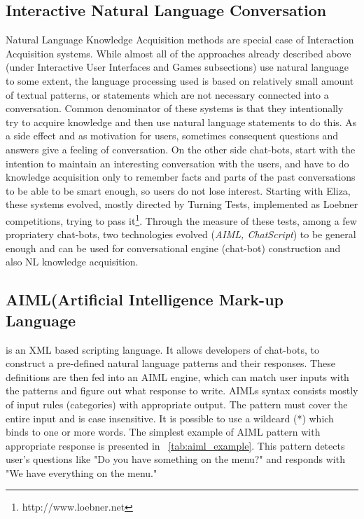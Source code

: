 \subsection{Interactive Natural Language Conversation}
Natural Language Knowledge Acquisition methods are special case of Interaction Acquisition
systems. While almost all of the approaches already described above (under 
Interactive User Interfaces and Games subsections) use natural language to some
extent, the language processing used is based on relatively small amount of
 textual patterns, or statements which are not necessary connected into a conversation. Common denominator of these systems is that they intentionally 
try to acquire knowledge and then use natural language statements to do this. As a side
effect and as motivation for users, sometimes consequent questions and 
answers give a feeling of conversation. 
On the other side chat-bots, start with the intention to maintain an interesting conversation
with the users, and have to do knowledge acquisition only to remember facts and parts of
the past conversations to be able to be smart enough, so users do not lose interest.
Starting with Eliza\parencite{Weizenbaum1966}, these systems evolved, mostly directed
by Turning Tests\parencite{Turing?}, implemented as Loebner competitions, trying to pass 
it\footnote{http://www.loebner.net}. Through the measure of these 
tests\parencite{Bradesko2012}, among a few propriatery chat-bots, two technologies 
evolved (\emph{AIML, ChatScript}) to be general enough and can
be used for conversational engine (chat-bot) construction and also NL knowledge acquisition.

\subsection{AIML(Artificial Intelligence Mark-up Language} is an XML based scripting language. 
It allows developers of chat-bots, to construct a pre-defined
natural language patterns and their responses. These definitions are then fed into an AIML
engine, which can match user inputs with the patterns and figure out what response to write. 
AIMLs syntax consists mostly of input rules (categories) with appropriate 
output. The pattern must cover the entire input and is case insensitive. It is possible to use 
a wildcard (*) which binds to one or more words. The simplest example of AIML pattern with
appropriate response is presented in \tablename~\ref{tab:aiml_example}. This pattern detects
user's questions like "Do you have something on the menu?" and responds with 
"We have everything on the menu."

